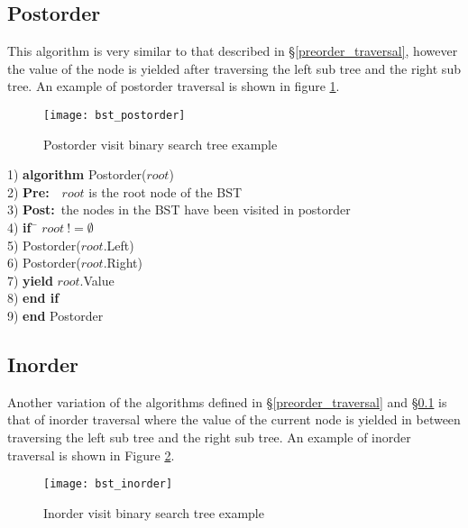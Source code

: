 \subsection{Postorder} \label{postorder_traversal}
This algorithm is very similar to that described in \S\ref{preorder_traversal}, however the value of the node is yielded after traversing the left sub tree and  the right sub tree. An example of postorder traversal is shown in figure \ref{fig:bst_postorder}.

\begin{figure}[htp]
\begin{center}
\texttt{[image: bst\_postorder]}
\end{center}
\caption{Postorder visit binary search tree example} \label{fig:bst_postorder}
\end{figure}

\begin{tabbing}
1)  \textbf{alg}\= \textbf{orithm} Postorder($root$) \\
2)  \> \textbf{Pre:}~~$root$ is the root node of the BST \\
3)  \> \textbf{Post:}~the nodes in the BST have been visited in postorder \\
4)  \> \textbf{if}~\= $root~!= \emptyset$ \\
5)  \> \> Postorder($root$.Left) \\
6)  \> \> Postorder($root$.Right) \\
7)  \> \> \textbf{yield} $root$.Value \\
8)  \> \textbf{end if} \\
9)  \textbf{end} Postorder \\
\end{tabbing}

\newpage
\subsection{Inorder}
Another variation of the algorithms defined in \S\ref{preorder_traversal} and \S\ref{postorder_traversal} is that of inorder traversal where the value of the current node is yielded in between traversing the left sub tree and  the right sub tree. An example of inorder traversal is shown in Figure \ref{fig:bst_inorder}.

\begin{figure}[htp]
\begin{center}
\texttt{[image: bst\_inorder]}
\end{center}
\caption{Inorder visit binary search tree example} \label{fig:bst_inorder}
\end{figure}


